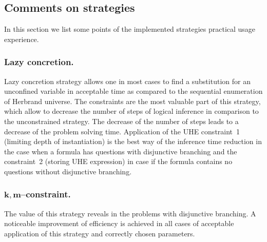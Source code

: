 \documentclass[runningheads,a4paper]{llncs}
\begin{document}









\subsection{Comments on strategies}

In this section we list some points of the implemented strategies practical usage experience.

\subsubsection{Lazy concretion.}
Lazy concretion strategy allows one in most cases to find a substitution for an unconfined variable in acceptable time as compared to the sequential enumeration of Herbrand universe. The constraints are the most valuable part of this strategy, which allow to decrease the number of steps of logical inference in comparison to the unconstrained strategy. The decrease of the number of steps leads to a decrease of the problem solving time. Application of the UHE constraint~1 (limiting depth of instantiation) is the best way of the inference time reduction in the case when a formula has questions with disjunctive branching and the constraint~2 (storing UHE expression) in case if the formula contains no questions without disjunctive branching.


\subsubsection{$\boldsymbol{k,m}$--constraint.}
The value of this strategy reveals in the problems with disjunctive branching. A noticeable improvement of efficiency is achieved in all cases of acceptable application of this strategy and correctly chosen parameters.
\end{document}
